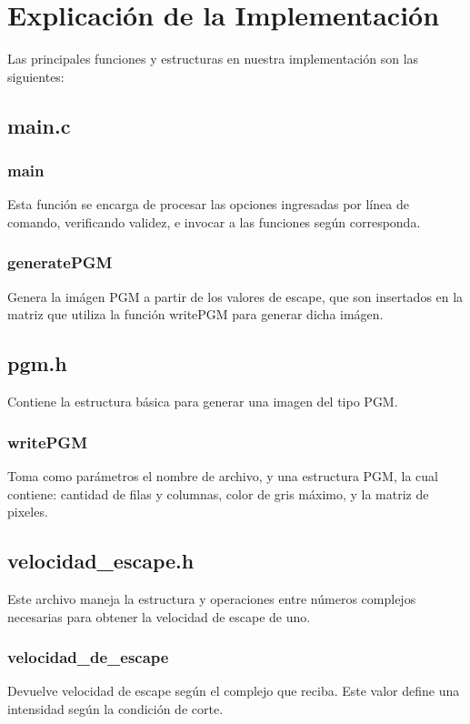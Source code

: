 \documentclass[a4paper,10pt]{article}
\begin{document}
\pagebreak



\section{Explicaci\'on de la Implementaci\'on}
Las principales funciones y estructuras en nuestra implementaci\'on son las siguientes:

\subsection{main.c}


\subsubsection{main}
Esta funci\'on se encarga de procesar las opciones ingresadas por l\'inea de comando, verificando validez, e invocar a las funciones  seg\'un corresponda.

\subsubsection{generatePGM}
Genera la im\'agen PGM a partir de los valores de escape, que son insertados en la matriz que utiliza la funci\'on writePGM para generar dicha im\'agen.

\subsection{pgm.h}
Contiene la estructura b\'asica para generar una imagen del tipo PGM.

\subsubsection{writePGM}
Toma como par\'ametros el nombre de archivo, y una estructura PGM, la cual contiene: cantidad de filas y columnas, color de gris m\'aximo, y la matriz de pixeles.

\subsection{velocidad\_escape.h}
Este archivo maneja la estructura y operaciones entre n\'umeros complejos necesarias para obtener la velocidad de escape de uno.

\subsubsection{velocidad\_de\_escape}
Devuelve velocidad de escape seg\'un el complejo que reciba. Este valor define una intensidad seg\'un la condici\'on de corte.
\end{document}
